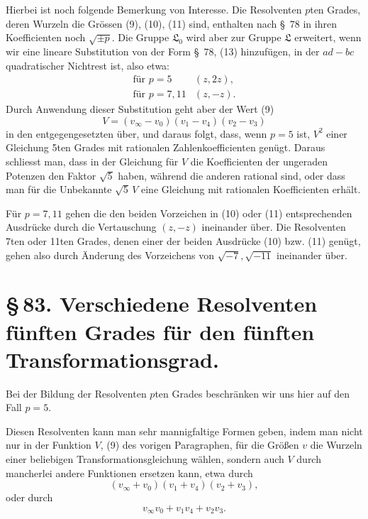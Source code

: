 \documentclass[11pt]{article}
\providecommand{\Lzero}{\mathfrak L_0}
\begin{document}
Hierbei ist noch folgende Bemerkung von Interesse. Die Resolventen $p$ten Grades, deren Wurzeln die Grössen (9), (10), (11) sind, enthalten nach \S~78 in ihren Koefficienten noch $\sqrt{\pm p}$. Die Gruppe $\Lzero$ wird aber zur Gruppe $\mathfrak L$ erweitert, wenn wir eine lineare Substitution von der Form \S~78, (13) hinzufügen, in der $ad-bc$ quadratischer Nichtrest ist, also etwa:
\[
 \begin{array}{ll}
 \text{für }p=5& (z,2z),\\[0.2em]
 \text{für }p=7,11& (z,-z).
 \end{array}
\]
Durch Anwendung dieser Substitution geht aber der Wert (9)
\[
 V=(v_\infty-v_0)(v_1-v_4)(v_2-v_3)
\]
in den entgegengesetzten über, und daraus folgt, dass, wenn $p=5$ ist, $V^2$ einer Gleichung 5ten Grades mit rationalen Zahlenkoefficienten genügt. Daraus schliesst man, dass in der Gleichung für $V$ die Koefficienten der ungeraden Potenzen den Faktor $\sqrt5$ haben, während die anderen rational sind, oder dass man für die Unbekannte $\sqrt5\,V$ eine Gleichung mit rationalen Koefficienten erhält.

Für $p=7,11$ gehen die den beiden Vorzeichen in (10) oder (11) entsprechenden Ausdrücke durch die Vertauschung $(z,-z)$ ineinander über. Die Resolventen 7ten oder 11ten Grades, denen einer der beiden Ausdrücke (10) bzw. (11) genügt, gehen also durch Änderung des Vorzeichens von $\sqrt{-7},\sqrt{-11}$ ineinander über.


\clearpage
\section*{\S\,83. Verschiedene Resolventen fünften Grades für den fünften Transformationsgrad.}

Bei der Bildung der Resolventen \(p\)ten Grades beschränken wir uns hier auf den Fall \(p=5\).

Diesen Resolventen kann man sehr mannigfaltige Formen geben, indem man nicht nur in der Funktion \(V\), (9) des vorigen Paragraphen, für die Größen \(v\) die Wurzeln einer beliebigen Transformationsgleichung wählen, sondern auch \(V\) durch mancherlei andere Funktionen ersetzen kann, etwa durch
\[
 (v_\infty+v_0)(v_1+v_4)(v_2+v_3),
\]
oder durch
\[
 v_\infty v_0+v_1v_4+v_2v_3.
\]
\end{document}
